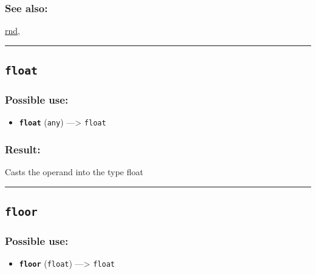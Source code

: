 \documentclass[]{book}
\providecommand{\tightlist}{%
  \setlength{\itemsep}{0pt}\setlength{\parskip}{0pt}}
\theoremstyle{definition}
\theoremstyle{definition}
\theoremstyle{definition}
\theoremstyle{remark}
\begin{document}
\subsubsection{See also:}\label{see-also-96}

\href{OperatorsNR\#rnd}{rnd},

\begin{center}\rule{0.5\linewidth}{\linethickness}\end{center}

\subsection{\texorpdfstring{\texttt{float}}{float}}\label{float}

\subsubsection{Possible use:}\label{possible-use-170}

\begin{itemize}
\tightlist
\item
  \textbf{\texttt{float}} (\texttt{any}) ---\textgreater{}
  \texttt{float}
\end{itemize}

\subsubsection{Result:}\label{result-164}

Casts the operand into the type float

\begin{center}\rule{0.5\linewidth}{\linethickness}\end{center}

\subsection{\texorpdfstring{\texttt{floor}}{floor}}\label{floor}

\subsubsection{Possible use:}\label{possible-use-171}

\begin{itemize}
\tightlist
\item
  \textbf{\texttt{floor}} (\texttt{float}) ---\textgreater{}
  \texttt{float}
\end{itemize}
\end{document}
